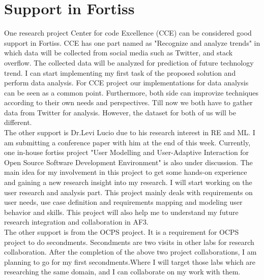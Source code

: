 \section{Support in Fortiss}

One research project Center for code Excellence (CCE) can be considered good support in Fortiss. CCE has one part named as "Recognize and analyze trends" in which data will be collected from social media such as Twitter, and stack overflow. The collected data will be analyzed for prediction of future technology trend. I can start implementing my first task of the proposed solution and perform data analysis. For CCE project our implementations for data analysis can be seen as a common point. Furthermore, both side can improvize techniques according to their own needs and perspectives. Till now we both have to gather data from Twitter for analysis. However, the dataset for both of us will be different.\\  

	The other support is Dr.Levi Lucio due to his research interest in RE and ML. I am submitting a conference paper with him at the end of this week. Currently, one in-house fortiss project "User Modelling and User-Adaptive Interaction for Open Source Software Development Environment" is also under discussion. The main idea for my involvement in this project to get some hands-on experience and gaining a new research insight into my research. I will start working on the user research and analysis part. This project mainly deals with requirements on user needs, use case definition and requirements mapping and modeling user behavior and skills. This project will also help me to understand my future research integration and collaboration in AF3.\\ 
	
	The other support is from the OCPS project. It is a requirement for OCPS project to do secondments. Secondments are two visits in other labs for research collaboration. After the completion of the above two project collaborations, I am planning to go for my first secondments.Where I will target those labs which are researching the same domain, and I can collaborate on my work with them.